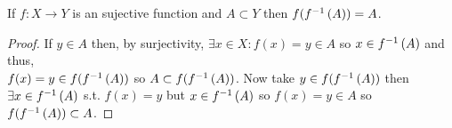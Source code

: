 \documentclass[12pt]{extarticle}
\begin{document}
\begin{lemma} \label{invsurj}
If $f : X \rightarrow Y$ is an sujective function and $A \subset Y$ then $f(f^{-1} \left( A \right)) = A$. 
\end{lemma}
\begin{proof}
If $y \in A$ then, by surjectivity, $\exists x \in X : f(x) = y \in A$ so $x \in f^{-1} \left( A \right)$ and thus, \\ $f(x) = y \in f(f^{-1} \left( A \right))$ so $A \subset f(f^{-1} \left( A \right))$. Now take $y \in f(f^{-1} \left( A \right))$ then $\exists x \in f^{-1} \left( A \right)$ s.t. $f(x) = y$ but $x \in f^{-1} \left( A \right)$ so $f(x) = y \in A$ so $f(f^{-1} \left( A \right)) \subset A$. 
\end{proof}
\end{document}
